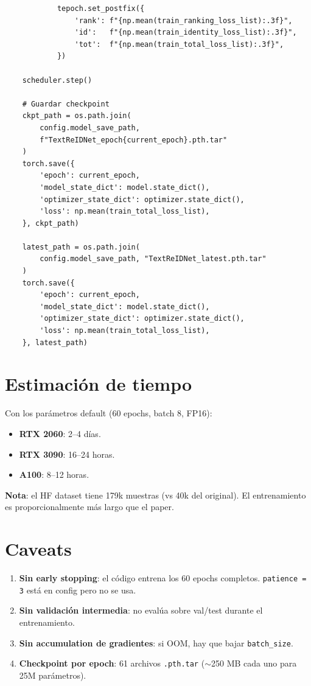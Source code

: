 \begin{verbatim}
            tepoch.set_postfix({
                'rank': f"{np.mean(train_ranking_loss_list):.3f}",
                'id':   f"{np.mean(train_identity_loss_list):.3f}",
                'tot':  f"{np.mean(train_total_loss_list):.3f}",
            })

    scheduler.step()

    # Guardar checkpoint
    ckpt_path = os.path.join(
        config.model_save_path,
        f"TextReIDNet_epoch{current_epoch}.pth.tar"
    )
    torch.save({
        'epoch': current_epoch,
        'model_state_dict': model.state_dict(),
        'optimizer_state_dict': optimizer.state_dict(),
        'loss': np.mean(train_total_loss_list),
    }, ckpt_path)

    latest_path = os.path.join(
        config.model_save_path, "TextReIDNet_latest.pth.tar"
    )
    torch.save({
        'epoch': current_epoch,
        'model_state_dict': model.state_dict(),
        'optimizer_state_dict': optimizer.state_dict(),
        'loss': np.mean(train_total_loss_list),
    }, latest_path)
\end{verbatim}

\section{Estimación de tiempo}

Con los parámetros default (60 epochs, batch 8, FP16):

\begin{itemize}
  \item \textbf{RTX 2060}: 2--4 días.
  \item \textbf{RTX 3090}: 16--24 horas.
  \item \textbf{A100}: 8--12 horas.
\end{itemize}

\noindent\textbf{Nota}: el HF dataset tiene 179k muestras (vs 40k
del original). El entrenamiento es proporcionalmente más largo
que el paper.

\section{Caveats}

\begin{enumerate}
  \item \textbf{Sin early stopping}: el código entrena los 60
        epochs completos. \texttt{patience = 3} está en config
        pero no se usa.
  \item \textbf{Sin validación intermedia}: no evalúa sobre
        val/test durante el entrenamiento.
  \item \textbf{Sin accumulation de gradientes}: si OOM, hay
        que bajar \texttt{batch\_size}.
  \item \textbf{Checkpoint por epoch}: 61 archivos
        \texttt{.pth.tar} ($\sim$250 MB cada uno para 25M
        parámetros).
\end{enumerate}
